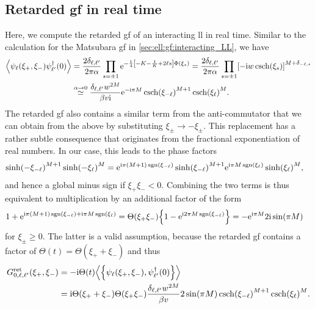 \subsection{Retarded \texorpdfstring{\acrshort{gf}}{GF} in real time}\label{sec:app:ret_gf_real_time}
Here, we compute the retarded \gls{gf} of an interacting \gls{ll} in real time.
Similar to the calculation for the Matsubara \gls{gf} in \autoref{sec:ell:gf:interacting_LL}, we have
\begin{align*}
\bra*{\psi_\ell(\xi_+, \xi_-) \psi_{\ell'}^\dagger(0)} &= \frac{2\delta_{\ell,\ell'}}{2\pi\alpha} \prod_{s=\pm 1} \powe{-\frac{1}{4} \klb*{-K - \frac{1}{K} + 2\ell s} \Phi(\xi_s)} = \frac{2\delta_{\ell,\ell'}}{2\pi\alpha} \prod_{s=\pm 1} \klb*{-\i w \csch(\xi_s)}^{M+\delta_{-\ell,s}} \\
&\asymeq{\alpha\rightarrow 0} \frac{\delta_{\ell,\ell'} w^{2M}}{\beta v\i} \powe{-\i\pi M} \csch(\xi_{-\ell})^{M+1} \csch(\xi_{\ell})^M.
\end{align*}
The retarded \gls{gf} also contains a similar term from the anti-commutator that we can obtain from the above by substituting $\xi_\pm \rightarrow - \xi_\pm$.
This replacement has a rather subtle consequence that originates from the fractional exponentiation of real numbers.
In our case, this leads to the phase factors
\begin{align*}
\sinh(-\xi_{-\ell})^{M+1} \sinh(-\xi_\ell)^M &= \text{e}^{\text{i}\pi (M+1) \operatorname{sgn}(\xi_{-\ell})} \sinh(\xi_{-\ell})^{M+1} \text{e}^{\text{i}\pi M \operatorname{sgn}(\xi_{\ell})} \sinh(\xi_{\ell})^M,
\end{align*}
and hence a global minus sign if $\xi_+\xi_- < 0$.
Combining the two terms is thus equivalent to multiplication by an additional factor of the form
\begin{align*}
1 + \powe{\i\pi (M+1) \sgn(\xi_{-\ell}) + \i\pi M \sgn(\xi_{\ell})} &= \Theta(\xi_+\xi_-) \klc*{1 - \powe{\i 2\pi M \sgn(\xi_{-\ell}) }} = -\powe{\i \pi M} 2\i\sin(\pi M)
\end{align*}
for $\xi_\pm\ge 0$.
The latter is a valid assumption, because the retarded \gls{gf} contains a factor of $\Theta(t) = \Theta(\xi_++\xi_-)$ and thus
\begin{align*}
G^\ret_{0,\ell,\ell'}(\xi_+, \xi_-) &= -\i\Theta(t) \bra*{\klc*{\psi_\ell(\xi_+, \xi_-), \psi_{\ell'}^\dagger(0)}} \\
&= \i\Theta(\xi_+ + \xi_-) \Theta(\xi_+\xi_-) \frac{\delta_{\ell,\ell'} w^{2M}}{\beta v} 2\sin(\pi M) \csch(\xi_{-\ell})^{M+1} \csch(\xi_{\ell})^M.
\end{align*}
